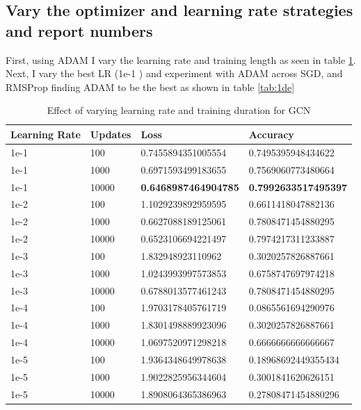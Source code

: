 \documentclass[11pt]{article}
\begin{document}
\subsection{Vary the optimizer and learning rate strategies and report numbers}
First, using ADAM I vary the learning rate and training length as seen in table \ref{tab:1d}. Next, I vary the best LR (1e-1 ) and experiment with ADAM across SGD, and RMSProp finding ADAM to be the best as shown in table \ref{tab:1de}
\begin{table}[]
\begin{tabular}{|l|l|l|l|} \hline
Learning Rate & Updates & Loss & Accuracy \\ \hline
1e-1 & 100  & 0.7455894351005554 & 0.7495395948434622 \\ \hline
1e-1 & 1000  & 0.6971593499183655 & 0.7569060773480664 \\ \hline
1e-1 & 10000  & \textbf{0.6468987464904785} & \textbf{0.7992633517495397}  \\ \hline
1e-2 & 100 & 1.1029239892959595 & 0.6611418047882136 \\ \hline
1e-2 & 1000  & 0.6627088189125061 & 0.7808471454880295 \\ \hline
1e-2 & 10000  & 0.6523106694221497 & 0.7974217311233887 \\ \hline
1e-3 & 100  & 1.832948923110962 & 0.3020257826887661 \\ \hline
1e-3 & 1000  & 1.0243993997573853 & 0.6758747697974218 \\ \hline
1e-3 & 10000  & 0.6788013577461243 & 0.7808471454880295 \\ \hline
1e-4 & 100  & 1.9703178405761719 & 0.0865561694290976 \\ \hline
1e-4 & 1000  & 1.8301498889923096 & 0.3020257826887661 \\ \hline
1e-4 & 10000  & 1.0697520971298218 & 0.6666666666666667 \\ \hline
1e-5 & 100  & 1.9364348649978638 & 0.18968692449355434 \\ \hline
1e-5 & 1000  & 1.9022825956344604 & 0.3001841620626151 \\ \hline
1e-5 & 10000  & 1.8908064365386963 & 0.27808471454880296 \\ \hline
\end{tabular}
\caption{Effect of varying learning rate and training duration for GCN}
\label{tab:1d}
\end{table}
\end{document}
